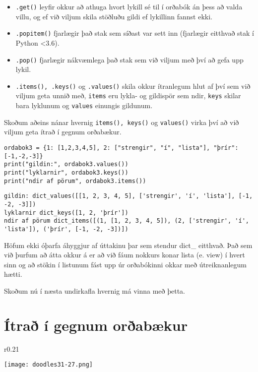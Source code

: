 \begin{itemize}
\item[] \texttt{.get()} leyfir okkur að athuga hvort lykill sé til í orðabók án þess að valda villu, og ef við viljum skila stöðluðu gildi ef lykillinn fannst ekki.
\item[] \texttt{.popitem()} fjarlægir það stak sem síðast var sett inn (fjarlægir eitthvað stak í Python <3.6).
\item[] \texttt{.pop()} fjarlægir nákvæmlega það stak sem við viljum með því að gefa upp lykil.
\item[] \texttt{.items(), .keys()} og \texttt{.values()} skila okkur ítranlegum hlut af því sem við viljum geta unnið með, \texttt{items} eru lykla- og gildispör sem ndir, \texttt{keys} skilar bara lyklunum og \texttt{values} einungis gildunum.
\end{itemize}

Skoðum aðeins nánar hvernig \texttt{items(), keys()} og \texttt{values()} virka því að við viljum geta ítrað í gegnum orðabækur.

\begin{lstlisting}[caption=Aðferðir á orðabækur, label=lst:dict-kynnt3]
ordabok3 = {1: [1,2,3,4,5], 2: ["strengir", "í", "lista"], "þrír": [-1,-2,-3]}
print("gildin:", ordabok3.values())
print("lyklarnir", ordabok3.keys())
print("ndir af pörum", ordabok3.items())
\end{lstlisting}
\lstset{style=uttak}
\begin{lstlisting}
gildin: dict_values([[1, 2, 3, 4, 5], ['strengir', 'í', 'lista'], [-1, -2, -3]])
lyklarnir dict_keys([1, 2, 'þrír'])
ndir af pörum dict_items([(1, [1, 2, 3, 4, 5]), (2, ['strengir', 'í', 'lista']), ('þrír', [-1, -2, -3])])
\end{lstlisting}
\lstset{style=venjulegt}

Höfum ekki óþarfa áhyggjur af úttakinu þar sem stendur dict\_ eitthvað.
Það sem við þurfum að átta okkur á er að við fáum nokkurs konar lista (e. view) í hvert sinn og að stökin í listunum fást upp úr orðabókinni okkar með útreiknanlegum hætti.

Skoðum nú í næsta undirkafla hvernig má vinna með þetta.

\section{Ítrað í gegnum orðabækur}
 \begin{wrapfigure}{r}{0.21\textwidth} %
	\begin{center}
		\texttt{[image: doodles31-27.png]}
	\end{center}
\end{wrapfigure}

